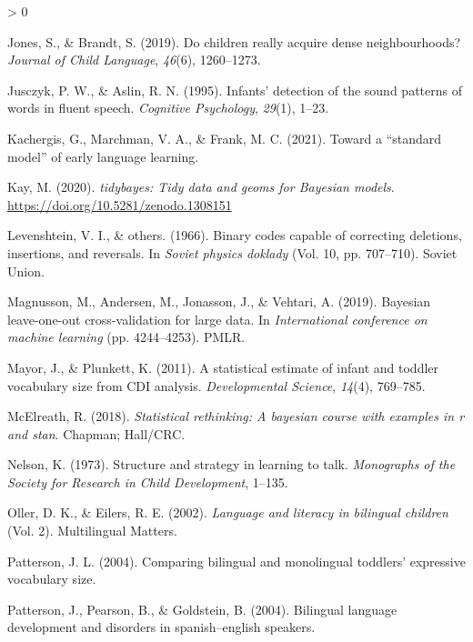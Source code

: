 \documentclass[
  english,
  man,man,floatsintext]{apa6}
\newlength{\cslhangindent}
\newenvironment{CSLReferences}[2] %
 {%
  \setlength{\parindent}{0pt}
  \ifodd #1 \everypar{\setlength{\hangindent}{\cslhangindent}}\ignorespaces\fi
  \ifnum #2 > 0
  \setlength{\parskip}{#2\baselineskip}
  \fi
 }%
 {}
\begin{document}
\begin{CSLReferences}{1}{0}
\leavevmode\hypertarget{ref-jones2019children}{}%
Jones, S., \& Brandt, S. (2019). Do children really acquire dense neighbourhoods? \emph{Journal of Child Language}, \emph{46}(6), 1260--1273.

\leavevmode\hypertarget{ref-jusczyk1995infants}{}%
Jusczyk, P. W., \& Aslin, R. N. (1995). Infants' detection of the sound patterns of words in fluent speech. \emph{Cognitive Psychology}, \emph{29}(1), 1--23.

\leavevmode\hypertarget{ref-kachergis2021toward}{}%
Kachergis, G., Marchman, V. A., \& Frank, M. C. (2021). Toward a {``standard model''} of early language learning.

\leavevmode\hypertarget{ref-R-tidybayes}{}%
Kay, M. (2020). \emph{{tidybayes}: Tidy data and geoms for {Bayesian} models}. \url{https://doi.org/10.5281/zenodo.1308151}

\leavevmode\hypertarget{ref-levenshtein1966binary}{}%
Levenshtein, V. I., \& others. (1966). Binary codes capable of correcting deletions, insertions, and reversals. In \emph{Soviet physics doklady} (Vol. 10, pp. 707--710). Soviet Union.

\leavevmode\hypertarget{ref-magnusson2019bayesian}{}%
Magnusson, M., Andersen, M., Jonasson, J., \& Vehtari, A. (2019). Bayesian leave-one-out cross-validation for large data. In \emph{International conference on machine learning} (pp. 4244--4253). PMLR.

\leavevmode\hypertarget{ref-mayor2011statistical}{}%
Mayor, J., \& Plunkett, K. (2011). A statistical estimate of infant and toddler vocabulary size from CDI analysis. \emph{Developmental Science}, \emph{14}(4), 769--785.

\leavevmode\hypertarget{ref-mcelreath2018statistical}{}%
McElreath, R. (2018). \emph{Statistical rethinking: A bayesian course with examples in r and stan}. Chapman; Hall/CRC.

\leavevmode\hypertarget{ref-nelson1973structure}{}%
Nelson, K. (1973). Structure and strategy in learning to talk. \emph{Monographs of the Society for Research in Child Development}, 1--135.

\leavevmode\hypertarget{ref-oller2002language}{}%
Oller, D. K., \& Eilers, R. E. (2002). \emph{Language and literacy in bilingual children} (Vol. 2). Multilingual Matters.

\leavevmode\hypertarget{ref-patterson2004comparing}{}%
Patterson, J. L. (2004). Comparing bilingual and monolingual toddlers' expressive vocabulary size.

\leavevmode\hypertarget{ref-patterson2004bilingual}{}%
Patterson, J., Pearson, B., \& Goldstein, B. (2004). Bilingual language development and disorders in spanish--english speakers.


\end{CSLReferences}
\end{document}

